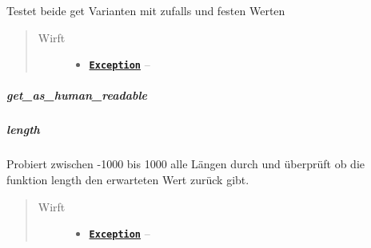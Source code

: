 \documentclass[letterpaper,10pt,ngerman]{sphinxmanual}
\begin{document}
\begin{fulllineitems}
\label{com/linuxluigi/polynomial/PolynomialTest:com.linuxluigi.polynomial.PolynomialTest.get()}
Testet beide get Varianten mit zufalls und festen Werten
\begin{quote}\begin{description}
\item[{Wirft}] \leavevmode\begin{itemize}
\item {} 
\href{http://docs.oracle.com/javase/6/docs/api/java/lang/Exception.html}{\textbf{\texttt{Exception}}} -- 

\end{itemize}

\end{description}\end{quote}

\end{fulllineitems}



\subparagraph{get\_as\_human\_readable}
\label{com/linuxluigi/polynomial/PolynomialTest:get-as-human-readable}

\begin{fulllineitems}
\label{com/linuxluigi/polynomial/PolynomialTest:com.linuxluigi.polynomial.PolynomialTest.get_as_human_readable()}
\end{fulllineitems}



\subparagraph{length}
\label{com/linuxluigi/polynomial/PolynomialTest:length}

\begin{fulllineitems}
\label{com/linuxluigi/polynomial/PolynomialTest:com.linuxluigi.polynomial.PolynomialTest.length()}
Probiert zwischen -1000 bis 1000 alle Längen durch und überprüft ob die funktion length den erwarteten Wert zurück gibt.
\begin{quote}\begin{description}
\item[{Wirft}] \leavevmode\begin{itemize}
\item {} 
\href{http://docs.oracle.com/javase/6/docs/api/java/lang/Exception.html}{\textbf{\texttt{Exception}}} -- 

\end{itemize}

\end{description}\end{quote}

\end{fulllineitems}
\end{document}
